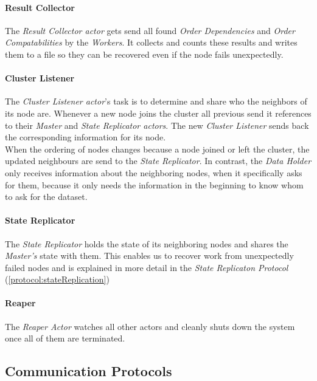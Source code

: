 \paragraph{Result Collector}
The \emph{Result Collector actor} gets send all found \emph{Order Dependencies} and \emph{Order Compatabilities} by the \emph{Workers}.
It collects and counts these results and writes them to a file so they can be recovered even if the node fails unexpectedly. 

\paragraph{Cluster Listener}
The \emph{Cluster Listener actor}'s task is to determine and share who the neighbors of its node are.
Whenever a new node joins the cluster all previous send it references to their \emph{Master} and \emph{State Replicator actors}.
The new \emph{Cluster Listener} sends back the corresponding information for its node. \\
When the ordering of nodes changes because a node joined or left the cluster, the updated neighbours are send to the \emph{State Replicator}.
In contrast, the \emph{Data Holder} only receives information about the neighboring nodes, when it specifically asks for them, because it only needs the information in the beginning to know whom to ask for the dataset.

\paragraph{State Replicator}
The \emph{State Replicator} holds the state of its neighboring nodes and shares the \emph{Master's} state with them. 
This enables us to recover work from unexpectedly failed nodes and is explained in more detail in the \emph{State Replicaton Protocol} (\ref{protocol:stateReplication})

\paragraph{Reaper} 
The \emph{Reaper Actor} watches all other actors and cleanly shuts down the system once all of them are terminated.

\subsection{Communication Protocols}


